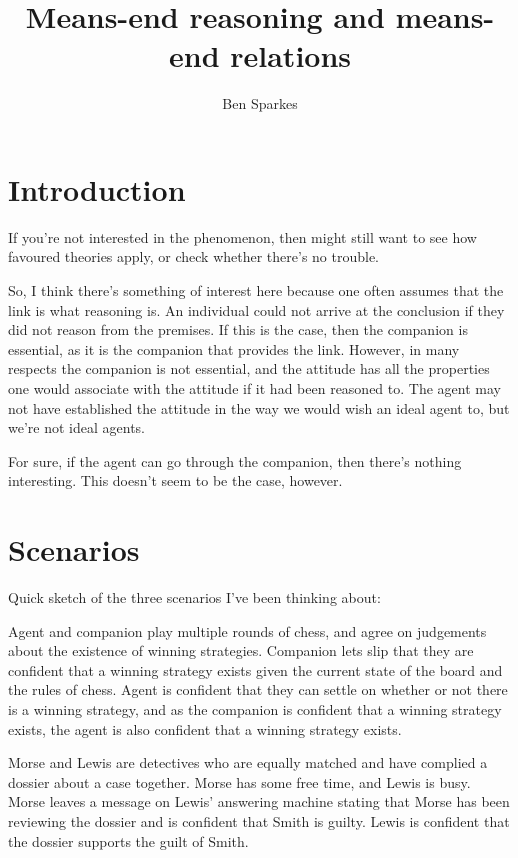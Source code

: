 \documentclass[10pt]{article}
\title{Means-end reasoning and means-end relations}
\author{Ben Sparkes}
\begin{document}
\section{Introduction}
\label{sec:introduction}

If you're not interested in the phenomenon, then might still want to see how favoured theories apply, or check whether there's no trouble.


So, I think there's something of interest here because one often assumes that the link is what reasoning is.
An individual could not arrive at the conclusion if they did not reason from the premises.
If this is the case, then the companion is essential, as it is the companion that provides the link.
However, in many respects the companion is not essential, and the attitude has all the properties one would associate with the attitude if it had been reasoned to.
The agent may not have established the attitude in the way we would wish an ideal agent to, but we're not ideal agents.

For sure, if the agent can go through the companion, then there's nothing interesting.
This doesn't seem to be the case, however.

\section{Scenarios}
\label{sec:scenarios}

Quick sketch of the three scenarios I've been thinking about:

\begin{scenario}[Chess]
  Agent and companion play multiple rounds of chess, and agree on judgements about the existence of winning strategies.
  Companion lets slip that they are confident that a winning strategy exists given the current state of the board and the rules of chess.
  Agent is confident that they can settle on whether or not there is a winning strategy, and as the companion is confident that a winning strategy exists, the agent is also confident that a winning strategy exists.
\end{scenario}

\begin{scenario}[Morse]
  Morse and Lewis are detectives who are equally matched and have complied a dossier about a case together.
  Morse has some free time, and Lewis is busy.
  Morse leaves a message on Lewis' answering machine stating that Morse has been reviewing the dossier and is confident that Smith is guilty.
  Lewis is confident that the dossier supports the guilt of Smith.
\end{scenario}
\end{document}
